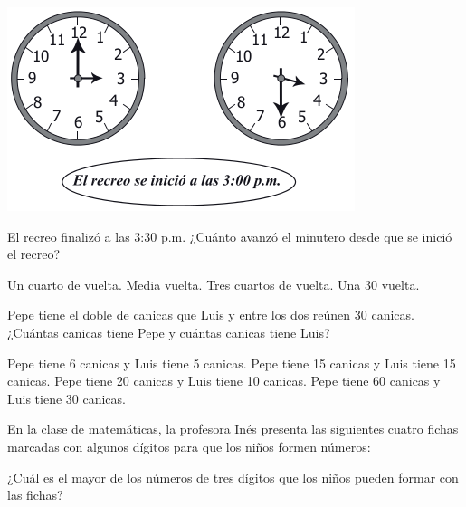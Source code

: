\documentclass[10pt,letterpaper,addpoints]{exam}
\begin{document}
\begin{multicols}{2}
\begin{questions}
\begin{center}
 \includegraphics[scale=.45]{Images/relojes.png}
 \end{center} 
\question El recreo finalizó a las 3:30 p.m. ¿Cuánto avanzó el minutero desde que se inició el recreo?
\begin{choices}
\choice Un cuarto de vuelta.
\CorrectChoice Media vuelta.
\choice Tres cuartos de vuelta.
\choice Una 30 vuelta.
\end{choices}
\question Pepe tiene el doble de canicas que Luis y entre los dos reúnen 30 canicas. ¿Cuántas canicas tiene Pepe y cuántas canicas tiene Luis?
\begin{choices}
\choice Pepe tiene 6 canicas y Luis tiene 5 canicas.
\choice Pepe tiene 15 canicas y Luis tiene 15 canicas.
\CorrectChoice Pepe tiene 20 canicas y Luis tiene 10 canicas.
\choice Pepe tiene 60 canicas y Luis tiene 30 canicas.
\end{choices}
\question En la clase de matemáticas, la profesora Inés presenta las siguientes cuatro fichas marcadas con algunos dígitos para que los niños formen números:
\begin{center}
\end{center}
¿Cuál es el mayor de los números de tres dígitos que los niños pueden formar con las fichas?
\begin{multicols}{2}
\begin{choices}
\end{choices}
\end{multicols}
\end{questions}
\end{multicols}
\end{document}
